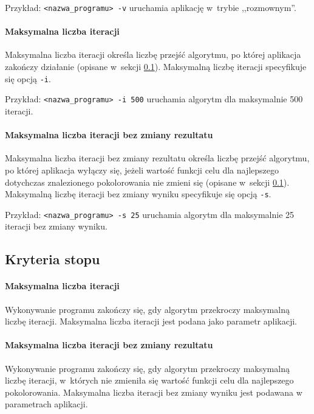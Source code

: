 Przykład: \verb+<nazwa_programu> -v+ uruchamia aplikację w~trybie ,,rozmownym''.

\paragraph{Maksymalna liczba iteracji}

Maksymalna liczba iteracji określa liczbę przejść algorytmu, po której aplikacja zakończy działanie (opisane w~sekcji \ref{sec:stop_criteria}). Maksymalną liczbę iteracji specyfikuje się opcją \verb+-i+.

Przykład: \verb+<nazwa_programu> -i 500+ uruchamia algorytm dla maksymalnie 500 iteracji.

\paragraph{Maksymalna liczba iteracji bez zmiany rezultatu}

Maksymalna liczba iteracji bez zmiany rezultatu określa liczbę przejść algorytmu, po której aplikacja wyłączy się, jeżeli wartość funkcji celu dla najlepszego dotychczas znalezionego pokolorowania nie zmieni się (opisane w~sekcji \ref{sec:stop_criteria}). Maksymalną liczbę iteracji bez zmiany wyniku specyfikuje się opcją \verb+-s+.

Przykład: \verb+<nazwa_programu> -s 25+ uruchamia algorytm dla maksymalnie 25 iteracji bez zmiany wyniku.

\subsection{Kryteria stopu}
\label{sec:stop_criteria}

\paragraph{Maksymalna liczba iteracji}

Wykonywanie programu zakończy się, gdy algorytm przekroczy maksymalną liczbę iteracji. Maksymalna liczba iteracji jest podana jako parametr aplikacji.

\paragraph{Maksymalna liczba iteracji bez zmiany rezultatu}

Wykonywanie programu zakończy się, gdy algorytm przekroczy maksymalną liczbę iteracji, w~których nie zmieniła się wartość funkcji celu dla najlepszego pokolorowania. Maksymalna liczba iteracji bez zmiany wyniku jest podawana w parametrach aplikacji.

